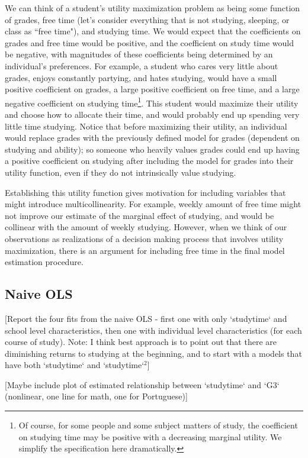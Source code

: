 \documentclass[12pt]{article}
\begin{document}
We can think of a student's utility maximization problem as being some function of grades, free time (let's consider everything that is not studying, sleeping, or class as ``free time"), and studying time. We would expect that the coefficients on grades and free time would be positive, and the coefficient on study time would be negative, with magnitudes of these coefficients being determined by an individual's preferences. For example, a student who cares very little about grades, enjoys constantly partying, and hates studying, would have a small positive coefficient on grades, a large positive coefficient on free time, and a large negative coefficient on studying time\footnote{Of course, for some people and some subject matters of study, the coefficient on studying time may be positive with a decreasing marginal utility. We simplify the specification here dramatically.}. This student would maximize their utility and choose how to allocate their time, and would probably end up spending very little time studying. Notice that before maximizing their utility, an individual would replace grades with the previously defined model for grades (dependent on studying and ability); so someone who heavily values grades could end up having a positive coefficient on studying after including the model for grades into their utility function, even if they do not intrinsically value studying.

Establishing this utility function gives motivation for including variables that might introduce multicollinearity. For example, weekly amount of free time might not improve our estimate of the marginal effect of studying, and would be collinear with the amount of weekly studying. However, when we think of our observations as realizations of a decision making process that involves utility maximization, there is an argument for including free time in the final model estimation procedure.


\subsection{Naive OLS}
\textcolor{BrickRed}{[Report the four fits from the naive OLS - first one with only `studytime` and school level characteristics, then one with individual level characteristics (for each course of study). Note: I think best approach is to point out that there are diminishing returns to studying at the beginning, and to start with a models that have both `studytime` and `studytime`$^2$]}

\textcolor{BrickRed}{[Maybe include plot of estimated relationship between `studytime` and `G3` (nonlinear, one line for math, one for Portuguese)]}
\end{document}
